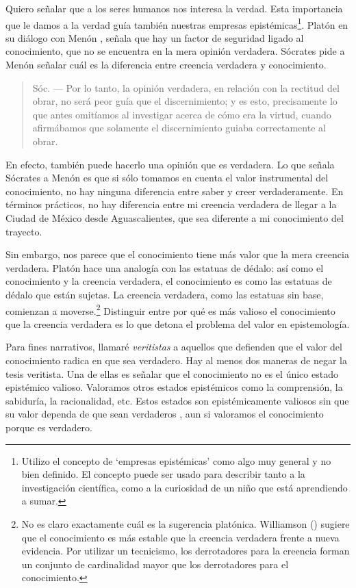 Quiero señalar que a los seres humanos nos interesa la verdad.
Esta importancia que le damos a la verdad guía también nuestras empresas epistémicas\footnote{Utilizo el concepto de ‘empresas epistémicas’ como algo muy general y no bien definido. El concepto puede ser usado para describir tanto a la investigación científica, como a la curiosidad de un niño que está aprendiendo a sumar.}.
Platón en su diálogo con Menón \parencite[][¶¶ 97a-98b]{platon2008}, señala que hay un factor de seguridad ligado al conocimiento, que no se encuentra en la mera opinión verdadera.
Sócrates pide a Menón señalar cuál es la diferencia entre creencia verdadera y conocimiento.

\begin{quote}
    Sóc. — Por lo tanto, la opinión verdadera, en relación con la rectitud del obrar, no será peor guía que el discernimiento; y es esto, precisamente lo que antes omitíamos al investigar acerca de cómo era la virtud, cuando afirmábamos que solamente el discernimiento guiaba correctamente al obrar.
\end{quote}
   
En efecto, también puede hacerlo una opinión que es verdadera.
Lo que señala Sócrates a Menón es que si sólo tomamos en cuenta el valor instrumental del conocimiento, no hay ninguna diferencia entre saber y creer verdaderamente.
En términos prácticos, no hay diferencia entre mi creencia verdadera de llegar a la Ciudad de México desde Aguascalientes, que sea diferente a mi conocimiento del trayecto.

Sin embargo, nos parece que el conocimiento tiene más valor que la mera creencia verdadera.
Platón hace una analogía con las estatuas de dédalo: así como el conocimiento y la creencia verdadera, el conocimiento es como las estatuas de dédalo que están sujetas.
La creencia verdadera, como las estatuas sin base, comienzan a moverse.\footnote{No es claro exactamente cuál es la sugerencia platónica. Williamson (\citeyear{williamson2002}) sugiere que el conocimiento es más estable que la creencia verdadera frente a nueva evidencia. Por utilizar un tecnicismo, los derrotadores para la creencia forman un conjunto de cardinalidad mayor que los derrotadores para el conocimiento.}
Distinguir entre por qué es más valioso el conocimiento que la creencia verdadera es lo que detona el problema del valor en epistemología.

Para fines narrativos, llamaré \emph{veritistas} a aquellos que defienden que el valor del conocimiento radica en que sea verdadero.
Hay al menos dos maneras de negar la tesis veritista.
Una de ellas es señalar que el conocimiento no es el único estado epistémico valioso.
Valoramos otros estados epistémicos como la comprensión, la sabiduría, la racionalidad, etc.
Estos estados son epistémicamente valiosos sin que su valor dependa de que sean verdaderos \parencite{kvanvig2003}, aun si valoramos el conocimiento porque es verdadero.

